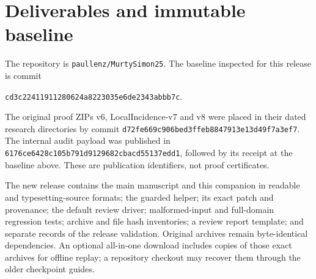 \documentclass[11pt,a4paper]{article}
\begin{document}
\section{Deliverables and immutable baseline}
The repository is \texttt{paullenz/MurtySimon25}. The baseline inspected for this release is commit
\begin{center}\texttt{cd3c22411911280624a8223035e6de2343abbb7c}.\end{center}
The original proof ZIPs v6, LocalIncidence-v7 and v8 were placed in their dated research directories by commit \texttt{d72fe669c906bed3ffeb8847913e13d49f7a3ef7}. The internal audit payload was published in \texttt{6176ce6428c105b791d9129682cbacd55137edd1}, followed by its receipt at the baseline above. These are publication identifiers, not proof certificates.

The new release contains the main manuscript and this companion in readable and typesetting-source formats; the guarded helper; its exact patch and provenance; the default review driver; malformed-input and full-domain regression tests; archive and file hash inventories; a review report template; and separate records of the release validation. Original archives remain byte-identical dependencies. An optional all-in-one download includes copies of those exact archives for offline replay; a repository checkout may recover them through the older checkpoint guides.
\end{document}
